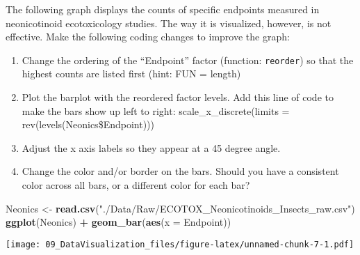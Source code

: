 \documentclass[]{article}
\newenvironment{Shaded}{\begin{snugshade}}{\end{snugshade}}
\newcommand{\KeywordTok}[1]{\textcolor[rgb]{0.13,0.29,0.53}{\textbf{#1}}}
\newcommand{\DataTypeTok}[1]{\textcolor[rgb]{0.13,0.29,0.53}{#1}}
\newcommand{\StringTok}[1]{\textcolor[rgb]{0.31,0.60,0.02}{#1}}
\newcommand{\OperatorTok}[1]{\textcolor[rgb]{0.81,0.36,0.00}{\textbf{#1}}}
\newcommand{\NormalTok}[1]{#1}
\providecommand{\tightlist}{%
  \setlength{\itemsep}{0pt}\setlength{\parskip}{0pt}}
\begin{document}
The following graph displays the counts of specific endpoints measured
in neonicotinoid ecotoxicology studies. The way it is visualized,
however, is not effective. Make the following coding changes to improve
the graph:

\begin{enumerate}
\def\labelenumi{\arabic{enumi}.}
\tightlist
\item
  Change the ordering of the ``Endpoint'' factor (function:
  \texttt{reorder}) so that the highest counts are listed first (hint:
  FUN = length)
\item
  Plot the barplot with the reordered factor levels. Add this line of
  code to make the bars show up left to right: scale\_x\_discrete(limits
  = rev(levels(Neonics\$Endpoint)))
\item
  Adjust the x axis labels so they appear at a 45 degree angle.
\item
  Change the color and/or border on the bars. Should you have a
  consistent color across all bars, or a different color for each bar?
\end{enumerate}

\begin{Shaded}
\begin{Highlighting}[]
\NormalTok{Neonics <-}\StringTok{ }\KeywordTok{read.csv}\NormalTok{(}\StringTok{"./Data/Raw/ECOTOX_Neonicotinoids_Insects_raw.csv"}\NormalTok{)}
\KeywordTok{ggplot}\NormalTok{(Neonics) }\OperatorTok{+}
\StringTok{  }\KeywordTok{geom_bar}\NormalTok{(}\KeywordTok{aes}\NormalTok{(}\DataTypeTok{x =}\NormalTok{ Endpoint))}
\end{Highlighting}
\end{Shaded}

\texttt{[image: 09\_DataVisualization\_files/figure-latex/unnamed-chunk-7-1.pdf]}
\end{document}
